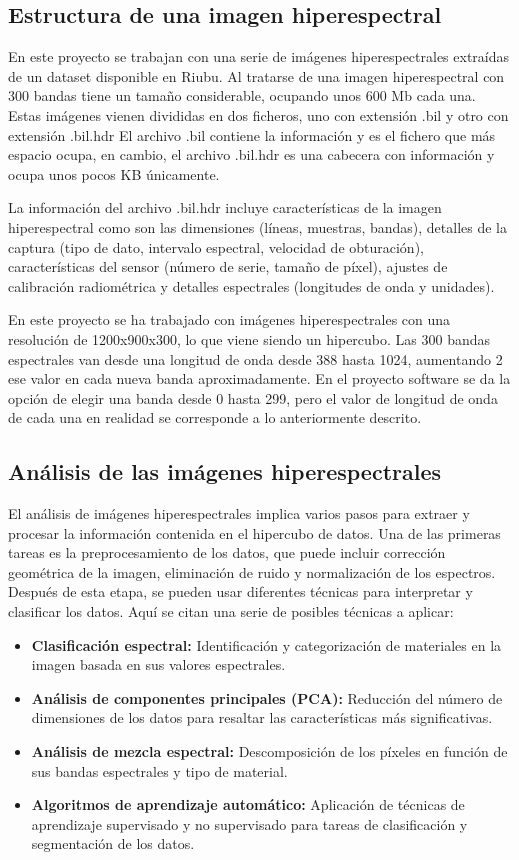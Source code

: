 \subsection{Estructura de una imagen hiperespectral}
En este proyecto se trabajan con una serie de imágenes hiperespectrales extraídas de un dataset disponible en Riubu. Al tratarse de una imagen hiperespectral con 300 bandas tiene un tamaño considerable, ocupando unos 600 Mb cada una. Estas imágenes vienen divididas en dos ficheros, uno con extensión .bil y otro con extensión .bil.hdr El archivo .bil contiene la información y es el fichero que más espacio ocupa, en cambio, el archivo .bil.hdr es una cabecera con información y ocupa unos pocos KB únicamente. 

La información del archivo .bil.hdr incluye características de la imagen hiperespectral como son las dimensiones (líneas, muestras, bandas), detalles de la captura (tipo de dato, intervalo espectral, velocidad de obturación), características del sensor (número de serie, tamaño de píxel), ajustes de calibración radiométrica y detalles espectrales (longitudes de onda y unidades).

En este proyecto se ha trabajado con imágenes hiperespectrales con una resolución de 1200x900x300, lo que viene siendo un hipercubo. Las 300 bandas espectrales van desde una longitud de onda desde 388 hasta 1024, aumentando 2 ese valor en cada nueva banda aproximadamente. En el proyecto software se da la opción de elegir una banda desde 0 hasta 299, pero el valor de longitud de onda de cada una en realidad se corresponde a lo anteriormente descrito.


\subsection{Análisis de las imágenes hiperespectrales}
El análisis de imágenes hiperespectrales implica varios pasos para extraer y procesar la información contenida en el hipercubo de datos. Una de las primeras tareas es la preprocesamiento de los datos, que puede incluir corrección geométrica de la imagen, eliminación de ruido y normalización de los espectros. Después de esta etapa, se pueden usar diferentes técnicas para interpretar y clasificar los datos. Aquí se citan una serie de posibles técnicas a aplicar:

\begin{itemize}
    \item \textbf{Clasificación espectral:} Identificación y categorización de materiales en la imagen basada en sus valores espectrales.
    \item \textbf{Análisis de componentes principales (PCA):} Reducción del número de dimensiones de los datos para resaltar las características más significativas.
    \item \textbf{Análisis de mezcla espectral:} Descomposición de los píxeles en función de sus bandas espectrales y tipo de material.
    \item \textbf{Algoritmos de aprendizaje automático:} Aplicación de técnicas de aprendizaje supervisado y no supervisado para tareas de clasificación y segmentación de los datos.
\end{itemize}


